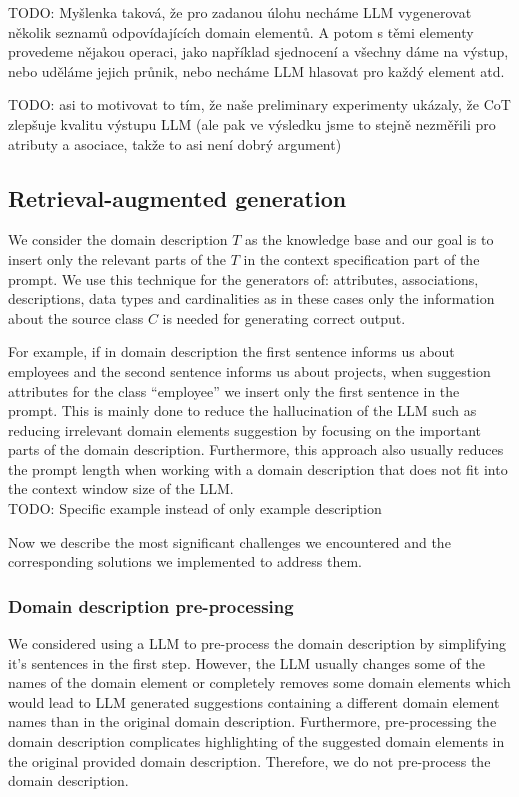 TODO: Myšlenka taková, že pro zadanou úlohu necháme LLM vygenerovat několik seznamů odpovídajících domain elementů. A potom s těmi elementy provedeme nějakou operaci, jako například sjednocení a všechny dáme na výstup, nebo uděláme jejich průnik, nebo necháme LLM hlasovat pro každý element atd.

TODO: asi to motivovat to tím, že naše preliminary experimenty ukázaly, že CoT zlepšuje kvalitu výstupu LLM (ale pak ve výsledku jsme to stejně nezměřili pro atributy a asociace, takže to asi není dobrý argument)


\subsection{Retrieval-augmented generation}

We consider the domain description $T$ as the knowledge base and our goal is to insert only the relevant parts of the $T$ in the context specification part of the prompt. We use this technique for the generators of: attributes, associations, descriptions, data types and cardinalities as in these cases only the information about the source class $C$ is needed for generating correct output.

For example, if in domain description the first sentence informs us about employees and the second sentence informs us about projects, when suggestion attributes for the class ``employee'' we insert only the first sentence in the prompt. This is mainly done to reduce the hallucination of the LLM such as reducing irrelevant domain elements suggestion by focusing on the important parts of the domain description. Furthermore, this approach also usually reduces the prompt length when working with a domain description that does not fit into the context window size of the LLM. \\

TODO: Specific example instead of only example description

Now we describe the most significant challenges we encountered and the corresponding solutions we implemented to address them.


\subsubsection{Domain description pre-processing}

We considered using a LLM to pre-process the domain description by simplifying it's sentences in the first step. However, the LLM usually changes some of the names of the domain element or completely removes some domain elements which would lead to LLM generated suggestions containing a different domain element names than in the original domain description. Furthermore, pre-processing the domain description complicates highlighting of the suggested domain elements in the original provided domain description. Therefore, we do not pre-process the domain description. \\

